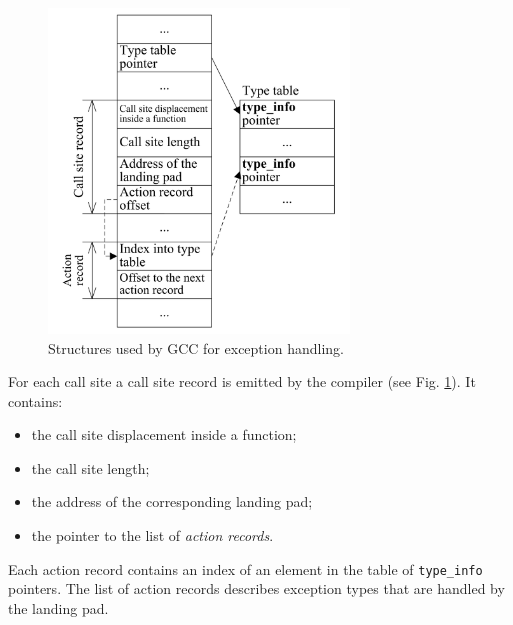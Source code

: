 \documentclass[10pt, conference, compsocconf]{IEEEtran}
\newcommand{\compact}{}
\newcommand{\skipspace}{}
\begin{document}

\begin{figure}[tb!]
\centering
  \includegraphics[width=8.0cm]{images/gcce}
\caption{Structures used by GCC for exception handling.}
\label{fig:gcce}
\end{figure}

For each call site a call site record is emitted by the compiler (see Fig. \ref{fig:gcce}). It contains:
\skipspace\begin{itemize}\compact
\item the call site displacement inside a function;
\item the call site length;
\item the address of the corresponding landing pad;
\item the pointer to the list of \textit{action records}.
\end{itemize}

Each action record contains an index of an element in the table 
of \lstinline{type_info} pointers.
The list of action records describes
exception types that are handled by the landing pad.

\end{document}
